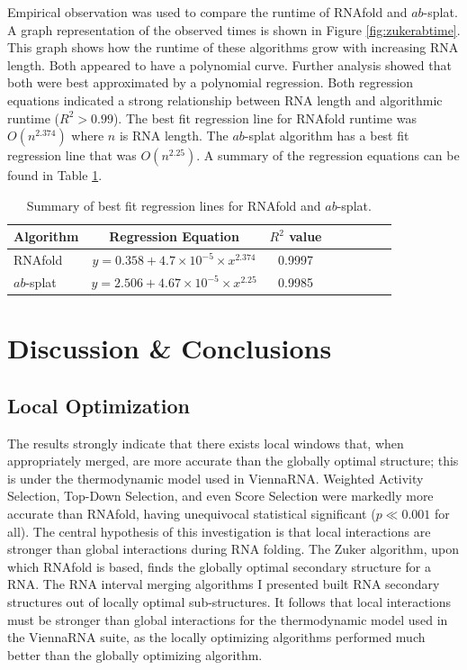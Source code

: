 \documentclass{cshonours}
\begin{document}
Empirical observation was used to compare the runtime of RNAfold and $ab$-splat. A graph representation of the observed times is shown in Figure \ref{fig:zukerabtime}. This graph shows how the runtime of these algorithms grow with increasing RNA length. Both appeared to have a polynomial curve. Further analysis showed that both were best approximated by a polynomial regression. Both regression equations indicated a strong relationship between RNA length and algorithmic runtime ($R^2 > 0.99$). The best fit regression line for RNAfold runtime was $O(n^{2.374})$ where $n$ is RNA length. The $ab$-splat algorithm has a best fit regression line that was $O(n^{2.25})$. A summary of the regression equations can be found in Table \ref{tab:algorithmtimeregression}.


\begin{table}
\centering
\begin{tabular}{l*{6}{c}r}
Algorithm	& Regression Equation & $R^2$ value \\
\hline
RNAfold &  $y=0.358+4.7 \times 10^{-5} \times x^{2.374}$    &    0.9997    \\
$ab$-splat & $y=2.506+ 4.67\times 10 ^{-5} \times x^{2.25}$    &    0.9985  \\
\end{tabular}

\caption{Summary of best fit regression lines for RNAfold and $ab$-splat.}
\label{tab:algorithmtimeregression}
\end{table}

\chapter{Discussion \& Conclusions}

\section{Local Optimization}
\label{sec:localopt}
The results strongly indicate that there exists local windows that, when appropriately merged, are more accurate than the globally optimal structure; this is under the thermodynamic model used in ViennaRNA. Weighted Activity Selection, Top-Down Selection, and even Score Selection were markedly more accurate than RNAfold, having unequivocal statistical significant ($p \ll 0.001$ for all). The central hypothesis of this investigation is that local interactions are stronger than global interactions during RNA folding. The Zuker algorithm, upon which RNAfold is based, finds the globally optimal secondary structure for a RNA. The RNA interval merging algorithms I presented built RNA secondary structures out of locally optimal sub-structures. It follows that local interactions must be stronger than global interactions for the thermodynamic model used in the ViennaRNA suite, as the locally optimizing algorithms performed much better than the globally optimizing algorithm.
\end{document}
